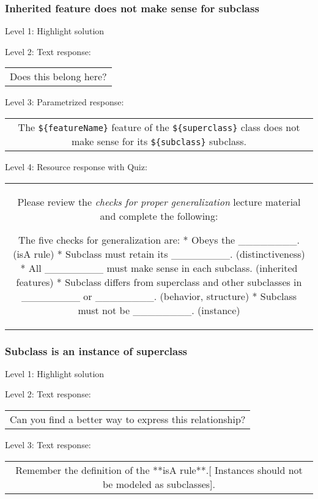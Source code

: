 \subsubsection{Inherited feature does not make sense for subclass}

\noindent Level 1: Highlight solution \medskip

\noindent Level 2: Text response: \medskip

\begin{tabular}{|c}
Does this belong here?
\end{tabular} \medskip

\noindent Level 3: Parametrized response: \medskip

\begin{tabular}{|c}
The \verb|${featureName}| feature of the \verb|${superclass}| class does not make sense for its \verb|${subclass}| subclass.
\end{tabular} \medskip

\noindent Level 4: Resource response with Quiz:

\begin{tabular}{|c}
Please review the \textit{checks for proper generalization} lecture material
and complete the following:

The five checks for generalization are:
* Obeys the ________. (isA rule)
* Subclass must retain its ________. (distinctiveness)
* All ________ must make sense in each subclass. (inherited features)
* Subclass differs from superclass and other subclasses in ________ or ________. 
(behavior, structure)
* Subclass must not be ________. (instance)
\end{tabular} \medskip


\subsubsection{Subclass is an instance of superclass}

\noindent Level 1: Highlight solution \medskip

\noindent Level 2: Text response: \medskip

\begin{tabular}{|c}
Can you find a better way to express this relationship?
\end{tabular} \medskip

\noindent Level 3: Text response: \medskip

\begin{tabular}{|c}
Remember the definition of the **isA rule**.[ Instances should not be modeled as subclasses].
\end{tabular} \medskip

